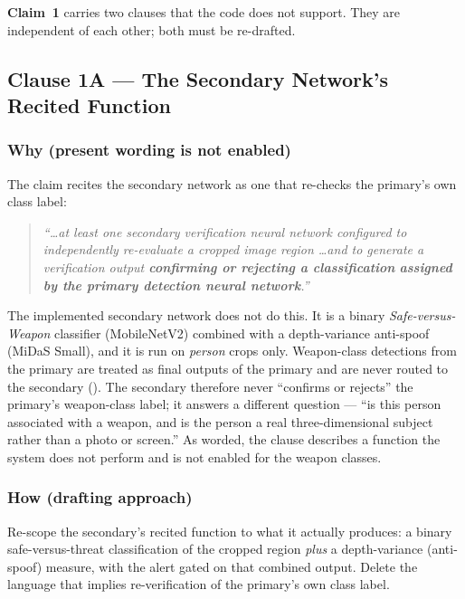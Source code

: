 \documentclass[12pt,a4paper]{article}
\newcommand{\clm}[1]{\textbf{Claim~#1}}
\begin{document}
\clm{1} carries two clauses that the code does not support. They are independent of each
other; both must be re-drafted.

\subsection{Clause 1A --- The Secondary Network's Recited Function}

\subsubsection{Why (present wording is not enabled)}
The claim recites the secondary network as one that re-checks the primary's own class label:

\begin{quote}\itshape
``\ldots at least one secondary verification neural network configured to independently
re-evaluate a cropped image region \ldots and to generate a verification output
\textbf{confirming or rejecting a classification} \textbf{assigned by the primary
detection neural network}.''
\end{quote}

The implemented secondary network does not do this. It is a binary \emph{Safe-versus-Weapon}
classifier (MobileNetV2) combined with a depth-variance anti-spoof (MiDaS Small), and it is
run on \emph{person} crops only. Weapon-class detections from the primary are treated as
final outputs of the primary and are never routed to the secondary
(). The secondary therefore never ``confirms or rejects''
the primary's weapon-class label; it answers a different question --- ``is this person
associated with a weapon, and is the person a real three-dimensional subject rather than a
photo or screen.'' As worded, the clause describes a function the system does not perform and
is not enabled for the weapon classes.

\subsubsection{How (drafting approach)}
Re-scope the secondary's recited function to what it actually produces: a binary
safe-versus-threat classification of the cropped region \emph{plus} a depth-variance
(anti-spoof) measure, with the alert gated on that combined output. Delete the language that
implies re-verification of the primary's own class label.
\end{document}
